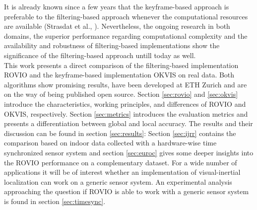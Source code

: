 It is already known since a few years that the keyframe-based approach is preferable to the filtering-based approach whenever the computational resources are available (Strasdat et al., \cite{strasdat2010real}). Nevertheless, the ongoing research in both domains, the superior performance regarding computational complexity and the availability and robustness of filtering-based implementations show the significance of the filtering-based approach untill today as well. \\

This work presents a direct comparison of the filtering-based implementation ROVIO and the keyframe-based implementation OKVIS on real data. Both algorithms show promising results, have been developed at ETH Zurich and are on the way of being published open source. Section \ref{sec:rovio} and \ref{sec:okvis} introduce the characteristics, working principles, and differences of ROVIO and OKVIS, respectively. Section \ref{sec:metrics} introduces the evaluation metrics and presents a differentiation between global and local accuracy. The results and their discussion can be found in section \ref{sec:results}: Section \ref{sec:ijrr} contains the comparison based on indoor data collected with a hardware-wise time synchronized sensor system and section \ref{sec:euroc} gives some deeper insights into the ROVIO performance on a complementary dataset. For a wide number of applications it will be of interest whether an implementation of visual-inertial localization can work on a generic sensor system. An experimental analysis approaching the question if ROVIO is able to work with a generic sensor system is found in section \ref{sec:timesync}. \\
